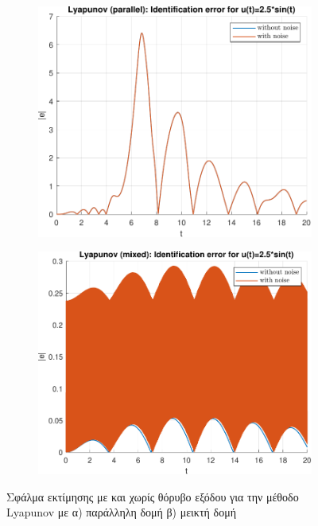 \documentclass[a4paper,12pt]{article}
\begin{document}
\begin{figure}[h!]
    \centering
    \begin{subfigure}{0.45\textwidth}
        \centering
        \includegraphics[width=\linewidth]{plot/task1_identification_error_lyapunov_parallel_noise.pdf}
        \caption{}
        \label{fig:task1_identification_error_lyapunov_parallel_noise}
    \end{subfigure}
    \hfill
    \begin{subfigure}{0.45\textwidth}
        \centering
        \includegraphics[width=\linewidth]{plot/task1_identification_error_lyapunov_mixed_noise.pdf}
        \caption{}
        \label{fig:task1_identification_error_lyapunov_mixed_noise}
    \end{subfigure}
    \caption{Σφάλμα εκτίμησης με και χωρίς θόρυβο εξόδου για την μέθοδο
    Lyapunov με 
    α) παράλληλη δομή β) μεικτή δομή}
    \label{fig:task1_identification_error_lyapunov_noise}
\end{figure}
\end{document}
